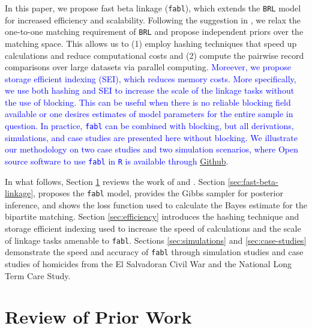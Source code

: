 \documentclass[ba]{imsart}
\begin{document}
In this paper, we propose fast beta linkage (\texttt{fabl}), which extends the \texttt{BRL} model for increased efficiency and scalability. Following the suggestion in \cite{wortman2019}, we relax the one-to-one matching requirement of \texttt{BRL} and propose independent priors over the matching space. This allows us to (1) employ hashing techniques that speed up calculations and reduce computational costs and (2) compute the pairwise record comparisons over large datasets via parallel computing. \textcolor{blue}{Moreever, we propose storage efficient indexing (SEI), which reduces memory costs.}
 \textcolor{blue}{More specifically, we use both hashing and SEI to increase the scale of the linkage tasks without the use of blocking. This can be useful when there is no reliable blocking field available or one desires estimates of model parameters for the entire sample in question. In practice, \texttt{fabl} can be combined with blocking, but all derivations, simulations, and case studies are presented here without blocking. We illustrate our methodology on two case studies and two simulation scenarios, where Open source software to use \texttt{fabl} in \texttt{R} is available through \href{https://github.com/briankundinger/parlrdev}{Github}.}




In what follows, Section \ref{sec:review-of_prior-work} reviews the work of \cite{fellegi_theory_1969} and \cite{sadinle_bayesian_2017}. Section \ref{sec:fast-beta-linkage}, proposes the \texttt{fabl} model, provides the Gibbs sampler for posterior inference, and shows the loss function used to calculate the Bayes estimate for the bipartite matching. Section \ref{sec:efficiency} introduces the hashing technique and storage efficient indexing used to increase the speed of calculations and the scale of linkage tasks amenable to \texttt{fabl}. Sections \ref{sec:simulations} and \ref{sec:case-studies} demonstrate the speed and accuracy of \texttt{fabl} through simulation studies and case studies of homicides from the El Salvadoran Civil War and the National Long Term Care Study.

\section{Review of Prior Work}
\label{sec:review-of_prior-work}
\end{document}
